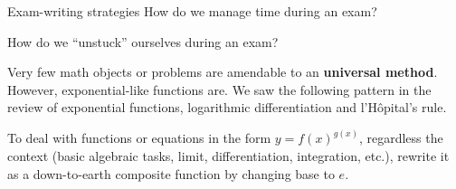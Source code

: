 \documentclass[../main.tex]{subfiles}
\begin{document}
\begin{lesson}{Exam-writing strategies}
  \faComment{} How do we manage time during an exam?
  \clearpage

  \faComment{} How do we ``unstuck'' ourselves during an exam?
  \clearpage


  \clearpage
  Very few math objects or problems are amendable to an \textbf{universal method}. However, exponential-like functions are. We saw the following pattern in the review of exponential functions, logarithmic differentiation and l'H\^opital's rule.

  To deal with functions or equations in the form \(y = f(x)^{g(x)}\), regardless the context (basic algebraic tasks, limit, differentiation, integration, etc.), rewrite it as a down-to-earth composite function by changing base to \(e\).


\end{lesson}
\end{document}
